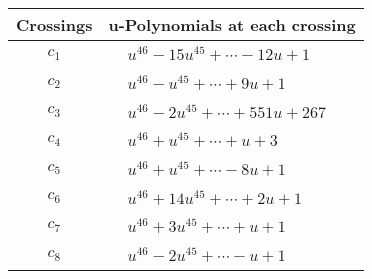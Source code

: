 \documentclass[1p]{elsarticle_modified}
\theoremstyle{definition}
\begin{document}
\begin{tabular}{m{50pt}|m{274pt}}
Crossings & \hspace{64pt}u-Polynomials at each crossing \\
\hline $$\begin{aligned}c_{1}\end{aligned}$$&$\begin{aligned}
&u^{46}-15 u^{45}+\cdots-12 u+1
\end{aligned}$\\
\hline $$\begin{aligned}c_{2}\end{aligned}$$&$\begin{aligned}
&u^{46}- u^{45}+\cdots+9 u+1
\end{aligned}$\\
\hline $$\begin{aligned}c_{3}\end{aligned}$$&$\begin{aligned}
&u^{46}-2 u^{45}+\cdots+551 u+267
\end{aligned}$\\
\hline $$\begin{aligned}c_{4}\end{aligned}$$&$\begin{aligned}
&u^{46}+u^{45}+\cdots+u+3
\end{aligned}$\\
\hline $$\begin{aligned}c_{5}\end{aligned}$$&$\begin{aligned}
&u^{46}+u^{45}+\cdots-8 u+1
\end{aligned}$\\
\hline $$\begin{aligned}c_{6}\end{aligned}$$&$\begin{aligned}
&u^{46}+14 u^{45}+\cdots+2 u+1
\end{aligned}$\\
\hline $$\begin{aligned}c_{7}\end{aligned}$$&$\begin{aligned}
&u^{46}+3 u^{45}+\cdots+u+1
\end{aligned}$\\
\hline $$\begin{aligned}c_{8}\end{aligned}$$&$\begin{aligned}
&u^{46}-2 u^{45}+\cdots- u+1
\end{aligned}$\\

\end{tabular}
\end{document}
